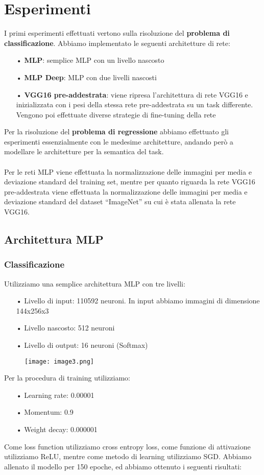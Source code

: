 \chapter{Esperimenti}

I primi esperimenti effettuati vertono sulla risoluzione del {\bf problema di classificazione}.
\newline
Abbiamo implementato le seguenti architetture di rete:
\begin{itemize}
	\item[•]{\bf MLP}: semplice MLP con un livello nascosto
	\item[•]{\bf MLP Deep}: MLP con due livelli nascosti
	\item[•]{\bf VGG16 pre-addestrata}: viene ripresa l’architettura di rete VGG16 e inizializzata con i pesi della stessa rete pre-addestrata su un task differente. Vengono poi effettuate diverse strategie di fine-tuning della rete
\end{itemize}	
Per la risoluzione del {\bf problema di regressione} abbiamo effettuato gli esperimenti essenzialmente con le medesime architetture, andando però a modellare le architetture per la semantica del task.
\\
\\
Per le reti MLP viene effettuata la normalizzazione delle immagini per media e deviazione standard del training set, mentre per quanto riguarda la rete VGG16 pre-addestrata viene effettuata la normalizzazione delle immagini per media e deviazione standard del dataset “ImageNet” su cui è stata allenata la rete VGG16.

\section{Architettura MLP}

\subsection{Classificazione}
Utilizziamo una semplice architettura MLP con tre livelli:
\begin{itemize}
	\item[•]Livello di input: 110592 neuroni. In input abbiamo immagini di dimensione 144x256x3
	\item[•]Livello nascosto: 512 neuroni
	\item[•]Livello di output: 16 neuroni (Softmax)
\end{itemize}
\begin{figure}[H]
	\centering
	\texttt{[image: image3.png]}
\end{figure}
Per la procedura di training utilizziamo: 
\begin{itemize}
	\item[•]Learning rate: 0.00001
	\item[•]Momentum: 0.9
	\item[•]Weight decay: 0.000001
\end{itemize}
Come loss function utilizziamo cross entropy loss, come funzione di attivazione utilizziamo ReLU, mentre come metodo di learning utilizziamo SGD.
\newline
Abbiamo allenato il modello per 150 epoche, ed abbiamo ottenuto i seguenti risultati:


